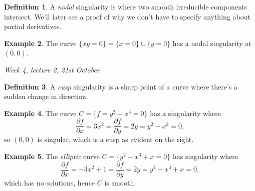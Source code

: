 \documentclass{article}
\theoremstyle{definition}
\newtheorem{defn}{Definition}[subsection]
\newtheorem{example}[defn]{Example}
\begin{document}
\begin{defn}
A \textit{nodal} singularity is where two smooth irreducible components intersect. We'll later see a proof of why we don't have to specify anything about partial derivatives.
\end{defn}
\begin{example}
The curve $\{xy=0\}=\{x=0\}\cup\{y=0\}$ has a nodal singularity at $(0,0)$.
\end{example}

\begin{flushright}
\textit{Week 4, lecture 2, 21st October}
\end{flushright}

\begin{minipage}{0.75\textwidth}
\begin{defn}
A \textit{cusp} singularity is a sharp point of a curve where there's a sudden change in direction.
\end{defn}
\begin{example}
The curve $C=\{f=y^2-x^3=0\}$ has a singularity where
\[
\frac{\partial f}{\partial x}=3x^2=\frac{\partial f}{\partial y}=2y=y^2-x^3=0,
\]
so $(0,0)$ is singular, which is a cusp as evident on the right.
\end{example}
\end{minipage}
\begin{minipage}{0.25\textwidth}
\end{minipage}

\begin{minipage}{0.75\textwidth}
\begin{example}
The \textit{elliptic} curve $C=\{y^2-x^3+x=0\}$ has singularity where
\[
\frac{\partial f}{\partial x}=-3x^2+1=\frac{\partial f}{\partial y}=2y=y^2-x^3+x=0,
\]
which has no solutions, hence $C$ is smooth. 
\end{example}
\end{minipage}
\begin{minipage}{0.25\textwidth}
\end{minipage}
\end{document}
